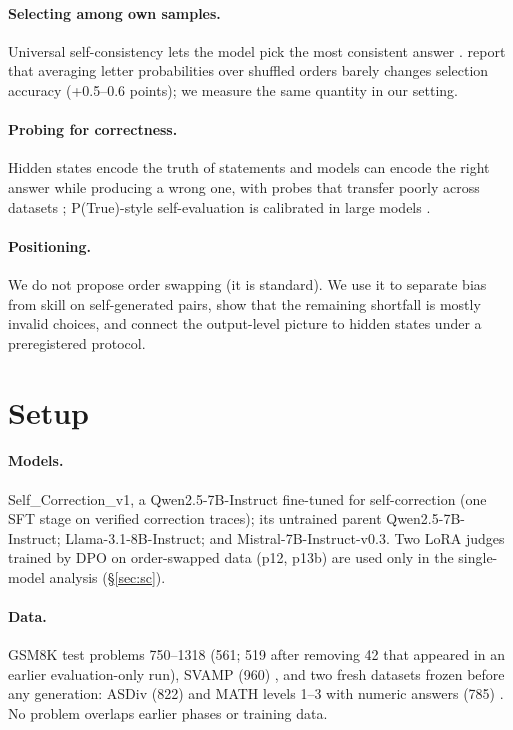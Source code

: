 \documentclass[11pt]{article}
\begin{document}
\paragraph{Selecting among own samples.} Universal self-consistency lets the model pick the most consistent
answer \citep{chen2023usc}. \citet{ren2023selfeval} report that averaging letter probabilities over shuffled
orders barely changes selection accuracy (+0.5--0.6 points); we measure the same quantity in our setting.
\paragraph{Probing for correctness.} Hidden states encode the truth of statements
\citep{burns2023latent,azaria2023lying,marks2023geometry} and models can encode the right answer while
producing a wrong one, with probes that transfer poorly across datasets \citep{orgad2025know}; P(True)-style
self-evaluation is calibrated in large models \citep{kadavath2022know}.
\paragraph{Positioning.} We do not propose order swapping (it is standard). We use it to separate bias from
skill on self-generated pairs, show that the remaining shortfall is mostly invalid choices, and connect the
output-level picture to hidden states under a preregistered protocol.

\section{Setup}
\paragraph{Models.} Self\_Correction\_v1, a Qwen2.5-7B-Instruct fine-tuned for self-correction (one SFT
stage on verified correction traces); its untrained parent Qwen2.5-7B-Instruct; Llama-3.1-8B-Instruct; and
Mistral-7B-Instruct-v0.3. Two LoRA judges trained by DPO on order-swapped data (p12, p13b) are used only in the
single-model analysis (\S\ref{sec:sc}).
\paragraph{Data.} GSM8K test problems 750--1318 \citep{cobbe2021gsm8k} (561; 519 after removing 42 that
appeared in an earlier evaluation-only run), SVAMP (960) \citep{patel2021svamp}, and two fresh datasets frozen
before any generation: ASDiv (822) \citep{miao2020asdiv} and MATH levels 1--3 with numeric answers (785)
\citep{hendrycks2021math}. No problem overlaps earlier phases or training data.
\end{document}
